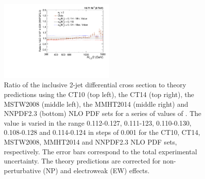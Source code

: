 \begin{figure}[!htbp]
\begin{center}
 \vspace*{3mm}
 \includegraphics[width=0.51\textwidth]{Plots_HT_2_150/Sensitivity_2_ratio_NLO_NNPDF23_EW.pdf}
 \caption{Ratio of the inclusive 2-jet differential cross section to theory predictions using the CT10 (top left), the CT14 (top right), the MSTW2008 (middle left), the MMHT2014 (middle right) and NNPDF2.3 (bottom) NLO PDF sets for a series of values of \alpsmz. The \alpsmz value is varied in the range 0.112-0.127, 0.111-123, 0.110-0.130, 0.108-0.128 and 0.114-0.124 in steps of 0.001 for the CT10, CT14, MSTW2008, MMHT2014 and NNPDF2.3 NLO PDF sets, respectively. The error bars correspond to the total experimental uncertainty. The theory predictions are corrected for non-perturbative (NP) and electroweak (EW) effects.}
 \label{fig:sensitivity_2}
 \end{center}
\end{figure}

